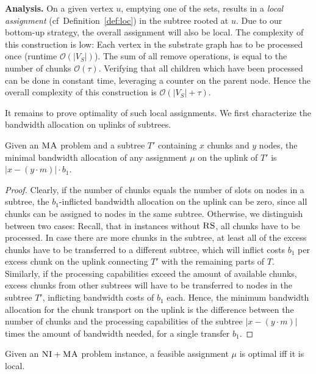 \documentclass[9pt]{sigcomm-alternate}
\newcommand{\MaFactor}{m}
\newcommand{\VmChunkAssignment}{\mu}
\newcommand{\ChunkType}{\tau}
\newcommand{\SubstrateNodes}{\ensuremath{V_S}}
\newcommand{\CC}{\textsc{NI}}
\newcommand{\RS}{\textsc{RS}}
\newcommand{\MA}{\textsc{MA}}
\newcommand{\Tree}{\ensuremath{T}}
\newcommand{\CostTrans}{\ensuremath{b_1}}
\begin{document}
\textbf{Analysis.} On a given vertex $u$, emptying one of the sets, results in a \emph{local assignment} (cf~Definition~\ref{def:loc})
in the
subtree rooted at $u$. Due to our bottom-up strategy, the overall assignment
will also be local. 
The complexity of this
construction is low: Each
vertex in the substrate graph has to be processed once (runtime
$\mathcal{O}(|\SubstrateNodes|)$). The sum of all remove operations, is equal to
the number of chunks $\mathcal{O}(\ChunkType)$. Verifying that all children
which have
been processed can be done in constant time, leveraging a counter on the parent
node. Hence the overall complexity of this construction is
$\mathcal{O}(|\SubstrateNodes| + \ChunkType)$.

It remains to prove optimality of such local assignments.
We first characterize the bandwidth allocation on uplinks of subtrees.
\begin{lemma}\label{lem:uplink-alloc}
Given an $\MA$ problem and a subtree $\Tree'$
containing $x$
chunks and $y$ nodes, the minimal bandwidth allocation of any 
assignment
$\VmChunkAssignment$ on the uplink of $\Tree'$ is $|x-(y\cdot\MaFactor)|\cdot
\CostTrans$.\label{lemma:uplink}
\end{lemma}
\begin{proof}
Clearly, if the number of chunks equals the number of slots on nodes in a 
subtree,
the $\CostTrans$-inflicted bandwidth allocation on the uplink can be 
zero, since all chunks can be assigned to nodes in the same subtree. 
Otherwise, we distinguish between two cases: Recall, that in instances 
without $\RS$, all chunks have to be processed. In case
there are more chunks in the subtree, at least all of the excess chunks have to 
be transferred to a different subtree, which will
inflict costs $\CostTrans$ per excess chunk on the uplink connecting $\Tree'$ 
with the
remaining parts of $\Tree$. Similarly, if the processing capabilities exceed the
amount of
available chunks, excess chunks from other subtrees will have to be transferred 
to
nodes in the subtree $\Tree'$, inflicting bandwidth costs of $\CostTrans$ each.
Hence, the minimum bandwidth allocation for the chunk transport on the uplink 
is the difference between the number of chunks and the processing capabilities 
of the subtree $|x-(y\cdot\MaFactor)|$ times the amount of bandwidth needed, 
for a single transfer $\CostTrans$.
\end{proof}


\begin{theorem}
Given an $\CC+\MA$ problem instance, a feasible assignment $\VmChunkAssignment$
is optimal iff it is local.
\label{thm:local_optimal}
\end{theorem}
\end{document}
